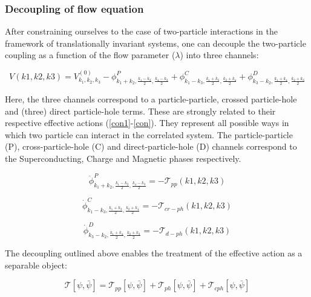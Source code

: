 \documentclass[12pt]{article}
\begin{document}
\subsubsection{Decoupling of flow equation}
After constraining ourselves to the case of two-particle interactions in the framework of translationally invariant systems, one can decouple the two-particle coupling as a function of the flow parameter ($\lambda$) into three channels:

\begin{equation} \label{V decoupling}
    V(k1,k2,k3)= V_{k_1, k_2, k_3}^{(0)} - \phi^{P}_{k_1 +k_2, \frac{k_1 - k_2}{2}, \frac{k_4-k_3}{2}} + \phi^{C}_{k_1 - k_3, \frac{k_1 +k_3}{2}, \frac{k_2+k_4}{2}} +\phi^{D}_{k_3- k_2, \frac{k_1 + k_4}{2}, \frac{k_2+k_3}{2}}
\end{equation}

\noindent Here, the three channels correspond to a particle-particle, crossed particle-hole and (three) direct particle-hole terms. These are strongly related to their respective effective actions (\ref{con1}-\ref{con}). They represent all possible ways in which two particle can interact in the correlated system. The particle-particle (P), cross-particle-hole (C) and direct-particle-hole (D) channels
correspond to the Superconducting, Charge and Magnetic phases respectively. 

\begin{equation}\label{con1}
    \dot{\phi}^{P}_{k_1 +k_2, \frac{k_1 - k_2}{2}, \frac{k_4-k_3}{2}} = - \mathcal{T}_{pp}(k1,k2,k3)
\end{equation}


\begin{equation}\label{con2}
    \dot{\phi}^{C}_{k_1 - k_3, \frac{k_1 +k_3}{2}, \frac{k_2+k_4}{2}} = - \mathcal{T}_{cr-ph}(k1,k2,k3)
\end{equation}

\begin{equation}\label{con}
    \dot{\phi}^{D}_{k_3- k_2, \frac{k_1 + k_4}{2}, \frac{k_2+k_3}{2}} = - \mathcal{T}_{d-ph}(k1,k2,k3)
\end{equation}

\noindent The decoupling outlined above enables the treatment of the effective action as a separable object:

\begin{equation}
    \mathcal{T}[\psi, \bar{\psi}] = \mathcal{T}_{pp}[\psi, \bar{\psi}] + \mathcal{T}_{ph}[\psi, \bar{\psi}] + \mathcal{T}_{cph}[\psi, \bar{\psi}]
\end{equation}
\end{document}
